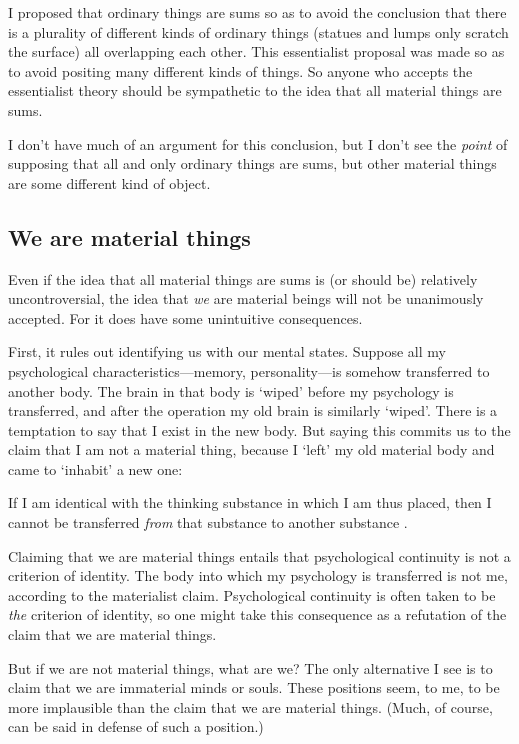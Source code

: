 \documentclass[11pt]{article}
\newenvironment{squote}{%
\begin{spacing}{1}
\begin{list}{}{%
\setlength{\labelwidth}{0pt}%
\rightmargin\leftmargin%
}
\item\relax
}{%
\end{list}%
\end{spacing}
}
\begin{document}
\begin{spacing}{1.5}
I proposed that ordinary things are sums so as to avoid the conclusion
that there is a plurality of different kinds of ordinary things
(statues and lumps only scratch the surface) all overlapping each
other.  This essentialist proposal was made so as to avoid positing
many different kinds of things.  So anyone who accepts the
essentialist theory should be sympathetic to the idea that all
material things are sums.

I don't have much of an argument for this conclusion, but I don't see
the {\em point} of supposing that all and only ordinary things are
sums, but other material things are some different kind of object.

\subsection{We are material things}
\label{material-beings}
Even if the idea that all material things are sums is (or should be)
relatively uncontroversial, the idea that {\em we} are material beings
will not be unanimously accepted.  For it does have some unintuitive
consequences.  

First, it rules out identifying us with our mental states.  Suppose
all my psychological characteristics---memory, personality---is
somehow transferred to another body.  The brain in that body is
`wiped' before my psychology is transferred, and after the operation
my old brain is similarly `wiped'.  There is a temptation to say that
I exist in the new body.  But saying this commits us to the claim that
I am not a material thing, because I `left' my old material body and
came to `inhabit' a new one:

\begin{squote}
 If I am identical with the thinking substance in which I am thus
 placed, then I cannot be transferred {\em from} that substance to
 another substance \citep[107]{chisholm1979}.
\end{squote}

Claiming that we are material things entails that psychological
continuity is not a criterion of identity.  The body into which my
psychology is transferred is not me, according to the materialist
claim.  Psychological continuity is often taken to be {\em the}
criterion of identity, so one might take this consequence as a
refutation of the claim that we are material things.

But if we are not material things, what are we?  The only alternative
I see is to claim that we are immaterial minds or souls.  These
positions seem, to me, to be more implausible than the claim that we
are material things.  (Much, of course, can be said in defense of such
a position.)


\end{spacing}
\end{document}
